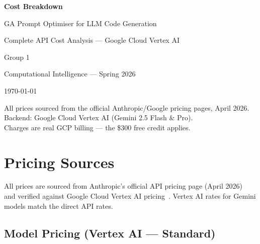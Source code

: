 \documentclass[11pt,a4paper]{report}
\begin{document}
\begin{titlepage}
\centering
\vspace*{3cm}
{\Huge\bfseries Cost Breakdown\par}
\vspace{0.8cm}
{\LARGE GA Prompt Optimiser for LLM Code Generation\par}
\vspace{1.5cm}
{\Large Complete API Cost Analysis --- Google Cloud Vertex AI\par}
\vspace{2cm}
{\large Group 1\par}
\vspace{0.5cm}
{\large Computational Intelligence --- Spring 2026\par}
\vspace{1cm}
{\large\today\par}
\vfill
{\small All prices sourced from the official Anthropic/Google pricing pages, April 2026.\\
Backend: Google Cloud Vertex AI (Gemini 2.5 Flash \& Pro).\\
Charges are real GCP billing --- the \$300 free credit applies.}
\end{titlepage}

\tableofcontents
\newpage


\chapter{Pricing Sources}

All prices are sourced from Anthropic's official API pricing page (April 2026)~\cite{anthropic-pricing}
and verified against Google Cloud Vertex AI pricing~\cite{vertex-pricing}.
Vertex AI rates for Gemini models match the direct API rates.

\section{Model Pricing (Vertex AI --- Standard)}
\end{document}
